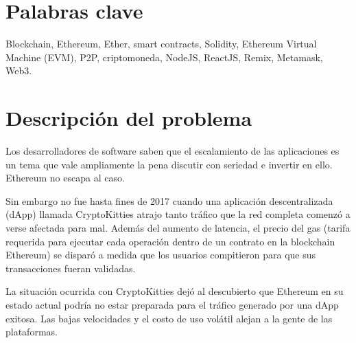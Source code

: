 \nomenclature[g-p]{$\pi$}{ $\simeq 3.14\ldots$}                                             %


\section{Palabras clave} %
Blockchain, Ethereum, Ether, smart contracts, Solidity, Ethereum Virtual Machine (EVM), P2P,
criptomoneda, NodeJS, ReactJS, Remix, Metamask, Web3.

\section{Descripción del problema} %
Los desarrolladores de software saben que el escalamiento de las aplicaciones es un tema
que vale ampliamente la pena discutir con seriedad e invertir en ello. Ethereum no escapa
al caso.

Sin embargo no fue hasta fines de 2017 cuando una aplicación descentralizada (dApp) llamada
CryptoKitties atrajo tanto tráfico que la red completa comenzó a verse afectada para mal.
Además del aumento de latencia, el precio del gas (tarifa requerida para ejecutar cada
operación dentro de un contrato en la blockchain Ethereum) se disparó a medida que los
usuarios compitieron para que sus transacciones fueran validadas.

La situación ocurrida con CryptoKitties dejó al descubierto que Ethereum en su estado
actual podría no estar preparada para el tráfico generado por una dApp exitosa.
Las bajas velocidades y el costo de uso volátil alejan a la gente de las plataformas.

